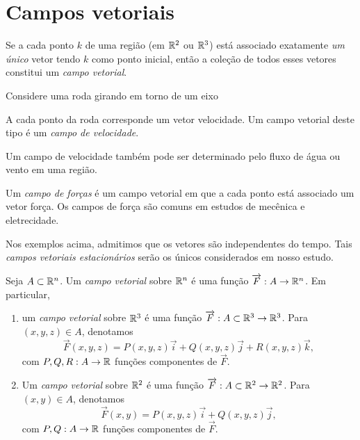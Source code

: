 \section{Campos vetoriais}

Se a cada ponto \(k\) de uma região (em \(\mathbb{R}^2\) ou \(\mathbb{R}^3\)) está associado exatamente \textit{um único} vetor tendo \(k\) como ponto inicial, então a coleção de todos esses vetores constitui um \textit{campo vetorial}.

\begin{example}
    Considere uma roda girando em torno de um eixo
    
    A cada ponto da roda corresponde um vetor velocidade. Um campo vetorial deste tipo é um \textit{campo de velocidade}.
\end{example}

\begin{example}
    Um campo de velocidade também pode ser determinado pelo fluxo de água ou vento em uma região.
\end{example}

\begin{example}
    Um \textit{campo de forças} é um campo vetorial em que a cada ponto está associado um vetor força. Os campos de força são comuns em estudos de mecênica e eletrecidade.
\end{example}

\begin{remark}
    Nos exemplos acima, admitimos que os vetores são independentes do tempo. Tais \textit{campos vetoriais estacionários} serão os únicos considerados em nosso estudo.
\end{remark}


\begin{definition}
    Seja \(A\subset\mathbb{R}^n\). Um \textit{campo vetorial} sobre \(\mathbb{R}^n\) é uma função \(\overrightarrow{F}:A\to\mathbb{R}^n\). Em particular,
        \begin{enumerate}
            \item um \textit{campo vetorial} sobre \(\mathbb{R}^3\) é uma função \(\overrightarrow{F}:A\subset\mathbb{R}^3\to\mathbb{R}^3\). Para \((x,y,z)\in A\), denotamos \[\overrightarrow{F}(x,y,z) = P(x,y,z)\overrightarrow{i} + Q(x,y,z)\overrightarrow{j} + R(x,y,z)\overrightarrow{k},\] com \(P,Q,R : A\to\mathbb{R}\) funções componentes de \(\overrightarrow{F}\).
            \item Um \textit{campo vetorial} sobre \(\mathbb{R}^2\) é uma função \(\overrightarrow{F}:A\subset\mathbb{R}^2\to\mathbb{R}^2\). Para \((x,y)\in A\), denotamos \[\overrightarrow{F}(x,y) = P(x,y,z)\overrightarrow{i} + Q(x,y,z)\overrightarrow{j},\] com \(P,Q : A\to\mathbb{R}\) funções componentes de \(\overrightarrow{F}\).
        \end{enumerate}
\end{definition}

